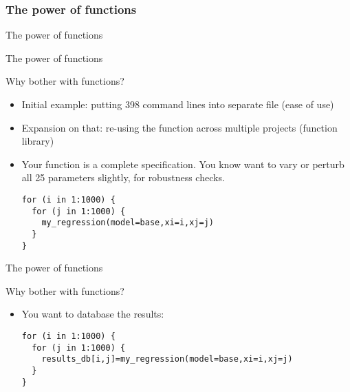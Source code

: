 \documentclass[xcolor=table,compress]{beamer}
\begin{document}
\subsubsection[Power]{The power of functions}
\begin{frame}
\vfill
The power of functions
\vfill
\end{frame}













\begin{frame}[fragile]{The power of functions}
\begin{block}{Why bother with functions?}
\begin{itemize}
\item Initial example: putting 398 command lines into separate file (ease of use)
\item Expansion on that: re-using the function across multiple projects (function library)
\item Your function is a complete specification. You know want to vary or perturb all 25 parameters slightly, for robustness checks.
\begin{lstlisting}
for (i in 1:1000) {
  for (j in 1:1000) {
  	my_regression(model=base,xi=i,xj=j)
  }
}
\end{lstlisting}
\end{itemize}
\end{block}
\end{frame}




\begin{frame}[fragile]{The power of functions}
\begin{block}{Why bother with functions?}
\begin{itemize}
\item You want to database the results:
\begin{lstlisting}
for (i in 1:1000) {
  for (j in 1:1000) {
  	results_db[i,j]=my_regression(model=base,xi=i,xj=j)
  }
}
\end{lstlisting}
\end{itemize}
\end{block}
\end{frame}
\end{document}
